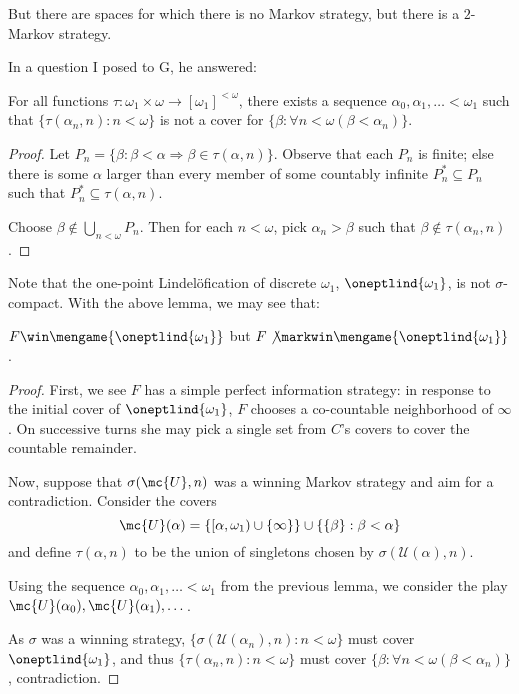   But there are spaces for which there is no Markov strategy, but there is a $2$-Markov strategy.

  In a question I posed to G, he answered:

  \begin{lem}
    For all functions $\tau:\omega_1\times\omega \rightarrow [\omega_1]^{<\omega}$, there exists a sequence $\alpha_0, \alpha_1, \dots < \omega_1$ such that $\{\tau(\alpha_n,n): n<\omega\}$ is not a cover for $\{\beta:\forall n<\omega (\beta < \alpha_n)\}$.
  \end{lem} 

  \begin{proof}
    Let $P_n = \{\beta: \beta < \alpha \Rightarrow \beta \in \tau(\alpha, n)\}$. Observe that each $P_n$ is finite; else there is some $\alpha$ larger than every member of some countably infinite $P_n^*\subseteq P_n$ such that $P_n^* \subseteq \tau(\alpha, n)$.

    Choose $\beta \not\in \bigcup_{n<\omega} P_n$. Then for each $n<\omega$, pick $\alpha_n>\beta$ such that $\beta \not\in \tau(\alpha_n, n)$.
  \end{proof}

  Note that the one-point Lindel\"ofication of discrete $\omega_1$, $\oneptlind{\omega_1}$, is not $\sigma$-compact. With the above lemma, we may see that:

  \begin{ex}
    $F \win \mengame{\oneptlind{\omega_1}}$ but $F \not\markwin \mengame{\oneptlind{\omega_1}}$.
  \end{ex}

  \begin{proof}
    First, we see $F$ has a simple perfect information strategy: in response to the initial cover of $\oneptlind{\omega_1}$, $F$ chooses a co-countable neighborhood of $\infty$. On successive turns she may pick a single set from $C$'s covers to cover the countable remainder.

    Now, suppose that $\sigma(\mc{U}, n)$ was a winning Markov strategy and aim for a contradiction. Consider the covers \[\mc{U}(\alpha) = \{[\alpha,\omega_1)\cup\{\infty\}\} \cup \{\{\beta\}:\beta < \alpha\}\] and define $\tau(\alpha,n)$ to be the union of singletons chosen by $\sigma(\mathcal{U}(\alpha),n)$. 

    Using the sequence $\alpha_0, \alpha_1,\dots<\omega_1$ from the previous lemma, we consider the play $\mc{U}(\alpha_0),\mc{U}(\alpha_1),\dots$.

    As $\sigma$ was a winning strategy, $\{\sigma(\mathcal{U}(\alpha_n),n): n<\omega\}$ must cover $\oneptlind{\omega_1}$, and thus $\{\tau(\alpha_n,n): n<\omega\}$ must cover $\{\beta:\forall n<\omega (\beta < \alpha_n)\}$, contradiction.
  \end{proof}

